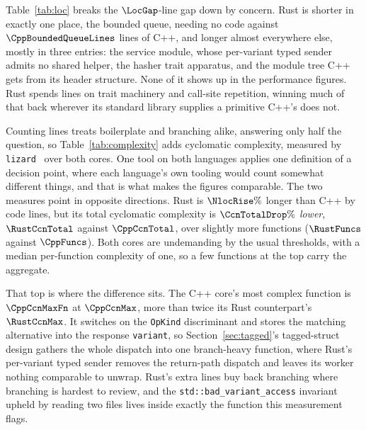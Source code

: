Table~\ref{tab:loc} breaks the $\LocGap$-line gap down by concern. Rust is shorter in exactly one
place, the bounded queue, needing no code against $\CppBoundedQueueLines$ lines of C++, and longer
almost everywhere else, mostly in three entries: the service module, whose per-variant typed
sender admits no shared helper, the hasher trait apparatus, and the module tree C++ gets from its
header structure. None of it shows up in the performance figures. Rust spends lines on trait
machinery and call-site repetition, winning much of that back wherever its standard library
supplies a primitive C++'s does not.

Counting lines treats boilerplate and branching alike, answering only half the question, so
Table~\ref{tab:complexity} adds cyclomatic complexity, measured by \texttt{lizard}~\cite{lizard}
over both cores. One tool on both languages applies one definition of a decision point, where
each language's own tooling would count somewhat different things, and that is what makes the
figures comparable. The two measures point in opposite directions. Rust is $\NlocRise\%$ longer
than C++ by code lines, but its total cyclomatic complexity is $\CcnTotalDrop\%$ \emph{lower},
$\RustCcnTotal$ against $\CppCcnTotal$, over slightly more functions ($\RustFuncs$ against
$\CppFuncs$). Both cores are undemanding by the usual thresholds, with a median per-function
complexity of one, so a few functions at the top carry the aggregate.

That top is where the difference sits. The C++ core's most complex function is $\CppCcnMaxFn$ at
$\CppCcnMax$, more than twice its Rust counterpart's $\RustCcnMax$. It switches on the
\texttt{OpKind} discriminant and stores the matching alternative into the response
\texttt{variant}, so Section~\ref{sec:tagged}'s tagged-struct design gathers the whole dispatch
into one branch-heavy function, where Rust's per-variant typed sender removes the return-path
dispatch and leaves its worker nothing comparable to unwrap. Rust's extra lines buy back branching
where branching is hardest to review, and the \texttt{std::bad\_variant\_access} invariant upheld
by reading two files lives inside exactly the function this measurement flags.

